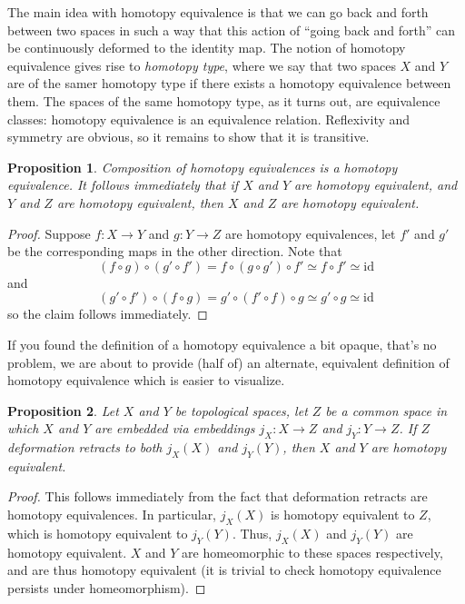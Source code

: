 \documentclass[10pt, oneside]{amsart}
\newtheorem{proposition}{Proposition}
\theoremstyle{definition}
\begin{document}
\noindent The main idea with homotopy equivalence is that we can go back and forth between
two spaces in such a way that this action of ``going back and forth'' can be continuously deformed to the identity map.
The notion of homotopy equivalence gives rise to \emph{homotopy type}, where we say that two spaces $X$ and $Y$ are of the samer homotopy type
if there exists a homotopy equivalence between them. The spaces of the same homotopy type, as it turns out, are equivalence classes: homotopy equivalence
is an equivalence relation. Reflexivity and symmetry are obvious, so it remains to show that it is transitive.

\begin{proposition}
  Composition of homotopy equivalences is a homotopy equivalence. It follows immediately that if $X$ and $Y$ are homotopy equivalent,
  and $Y$ and $Z$ are homotopy equivalent, then $X$ and $Z$ are homotopy equivalent.
\end{proposition}

\begin{proof}
  Suppose $f : X \rightarrow Y$ and $g : Y \rightarrow Z$ are homotopy equivalences, let $f'$ and $g'$ be the corresponding maps in the other direction.
  Note that
  \begin{equation}
    (f \circ g) \circ (g' \circ f') = f \circ (g \circ g') \circ f' \simeq f \circ f' \simeq \text{id}
  \end{equation}
  and
  \begin{equation}
    (g' \circ f') \circ (f \circ g) = g' \circ (f' \circ f) \circ g \simeq g' \circ g \simeq \text{id}
  \end{equation}
  so the claim follows immediately.
\end{proof}

If you found the definition of a homotopy equivalence a bit opaque, that's no problem, we are about to provide (half of) an
alternate, equivalent definition of homotopy equivalence which is easier to visualize.

\begin{proposition}
  Let $X$ and $Y$ be topological spaces, let $Z$ be a common space in which $X$ and $Y$ are embedded via embeddings $j_X : X \rightarrow Z$ and $j_Y : Y \rightarrow Z$.
  If $Z$ deformation retracts to both $j_X(X)$ and $j_Y(Y)$, then $X$ and $Y$ are homotopy equivalent.
\end{proposition}
\begin{proof}
  This follows immediately from the fact that deformation retracts are homotopy equivalences. In particular, $j_X(X)$ is homotopy equivalent to $Z$, which
  is homotopy equivalent to $j_Y(Y)$. Thus, $j_X(X)$ and $j_Y(Y)$ are homotopy equivalent. $X$ and $Y$ are homeomorphic to these spaces respectively,
  and are thus homotopy equivalent (it is trivial to check homotopy equivalence persists under homeomorphism).
  \end{proof}
\end{document}
